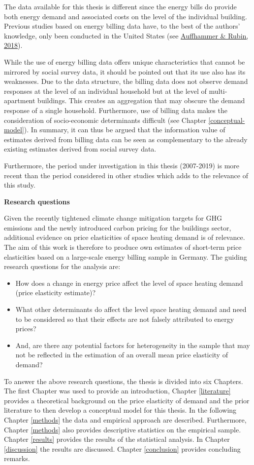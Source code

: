 \documentclass[12pt,twoside]{reedthesis}
\providecommand{\tightlist}{%
  \setlength{\itemsep}{0pt}\setlength{\parskip}{0pt}}
\begin{document}
The data available for this thesis is different since the energy bills do provide both energy demand and associated costs on the level of the individual building. Previous studies based on energy billing data have, to the best of the authors' knowledge, only been conducted in the United States (see \protect\hyperlink{ref-auffhammer_rubin18}{Auffhammer \& Rubin, 2018}).

While the use of energy billing data offers unique characteristics that cannot be mirrored by social survey data, it should be pointed out that its use also has its weaknesses. Due to the data structure, the billing data does not observe demand responses at the level of an individual household but at the level of multi-apartment buildings. This creates an aggregation that may obscure the demand response of a single household. Furthermore, use of billing data makes the consideration of socio-economic determinants difficult (see Chapter \ref{conceptual-model}). In summary, it can thus be argued that the information value of estimates derived from billing data can be seen as complementary to the already existing estimates derived from social survey data.

Furthermore, the period under investigation in this thesis (2007-2019) is more recent than the period considered in other studies which adds to the relevance of this study.

\textbf{Research questions}

Given the recently tightened climate change mitigation targets for GHG emissions and the newly introduced carbon pricing for the buildings sector, additional evidence on price elasticities of space heating demand is of relevance. The aim of this work is therefore to produce own estimates of short-term price elasticities based on a large-scale energy billing sample in Germany. The guiding research questions for the analysis are:
\begin{itemize}
\tightlist
\item
  How does a change in energy price affect the level of space heating demand (price elasticity estimate)?
\item
  What other determinants do affect the level space heating demand and need to be considered so that their effects are not falsely attributed to energy prices?
\item
  And, are there any potential factors for heterogeneity in the sample that may not be reflected in the estimation of an overall mean price elasticity of demand?
\end{itemize}
To answer the above research questions, the thesis is divided into six Chapters. The first Chapter was used to provide an introduction, Chapter \ref{literature} provides a theoretical background on the price elasticity of demand and the prior literature to then develop a conceptual model for this thesis. In the following Chapter \ref{methods} the data and empirical approach are described. Furthermore, Chapter \ref{methods} also provides descriptive statistics on the empirical sample. Chapter \ref{results} provides the results of the statistical analysis. In Chapter \ref{discussion} the results are discussed. Chapter \ref{conclusion} provides concluding remarks.
\end{document}
